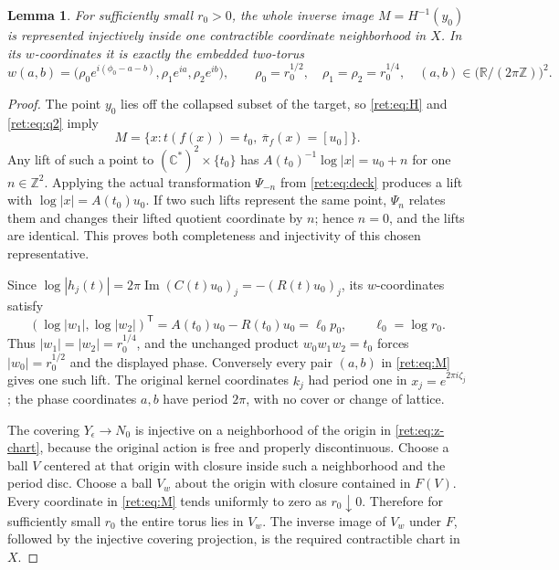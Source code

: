 \documentclass[11pt]{article}
\newtheorem{lemma}[theorem]{Lemma}
\theoremstyle{definition}
\begin{document}
\begin{lemma}
For sufficiently small \(r_0>0\), the whole inverse image
\(M=H^{-1}(y_0)\) is represented injectively inside one contractible
coordinate neighborhood in \(X\).  In its \(w\)-coordinates it is
exactly the embedded two-torus
\begin{equation}
 w(a,b)=
 \bigl(\rho_0e^{i(\phi_0-a-b)},\rho_1e^{ia},\rho_2e^{ib}\bigr),
 \qquad
 \rho_0=r_0^{1/2},\quad \rho_1=\rho_2=r_0^{1/4},
 \quad (a,b)\in\bigl(\mathbb R/(2\pi\mathbb Z)\bigr)^2.
 \label{ret:eq:M}
\end{equation}
\end{lemma}
\begin{proof}
The point \(y_0\) lies off the collapsed subset of the target, so
\eqref{ret:eq:H} and \eqref{ret:eq:q2} imply
\[
 M=\{x:t(f(x))=t_0,\ \overline\pi_f(x)=[u_0]\}.
\]
Any lift of such a point to \((\mathbb C^*)^2\times\{t_0\}\) has
\(A(t_0)^{-1}\log|x|=u_0+n\) for one \(n\in\mathbb Z^2\).
Applying the actual transformation \(\Psi_{-n}\) from
\eqref{ret:eq:deck} produces a lift with
\(\log|x|=A(t_0)u_0\).  If two such lifts represent the same point,
\(\Psi_n\) relates them and changes their lifted quotient coordinate
by \(n\); hence \(n=0\), and the lifts are identical.  This proves
both completeness and injectivity of this chosen representative.

Since
\(\log|h_j(t)|=2\pi\operatorname{Im}(C(t)u_0)_j
=-(R(t)u_0)_j\), its \(w\)-coordinates satisfy
\[
 (\log|w_1|,\log|w_2|)^{\mathsf T}
 =A(t_0)u_0-R(t_0)u_0=\ell_0p_0,
 \qquad \ell_0=\log r_0.
\]
Thus \(|w_1|=|w_2|=r_0^{1/4}\), and the unchanged product
\(w_0w_1w_2=t_0\) forces \(|w_0|=r_0^{1/2}\) and the displayed
phase.  Conversely every pair \((a,b)\) in \eqref{ret:eq:M} gives one
such lift.  The original kernel coordinates \(k_j\) had period one
in \(x_j=e^{2\pi i\zeta_j}\); the phase coordinates \(a,b\) have
period \(2\pi\), with no cover or change of lattice.

The covering \(Y_\epsilon\to N_0\) is injective on a neighborhood of
the origin in \eqref{ret:eq:z-chart}, because the original action is free
and properly discontinuous.  Choose a ball \(V\) centered at that
origin with closure inside such a neighborhood and the period disc.
Choose a ball \(V_w\) about the origin with closure contained in
\(F(V)\).  Every coordinate in \eqref{ret:eq:M} tends uniformly to zero
as \(r_0\downarrow0\).  Therefore for sufficiently small \(r_0\)
the entire torus lies in \(V_w\).  The inverse image of \(V_w\)
under \(F\), followed by the injective covering projection, is the
required contractible chart in \(X\).
\end{proof}
\end{document}
